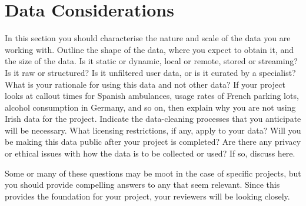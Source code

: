 \chapter{Data Considerations}

In this section you should characterise the nature and scale of the data you are working with. Outline the shape of the data, where you expect to obtain it, and the size of the data. Is it static or dynamic, local or remote, stored or streaming? Is it raw or structured? Is it unfiltered user data, or is it curated by a specialist? What is your rationale for using this data and not other data? If your project looks at callout times for Spanish ambulances, usage rates of French parking lots, alcohol consumption in Germany, and so on, then explain why you are not using Irish data for the project. Indicate the data-cleaning processes that you anticipate will be necessary. What licensing restrictions, if any, apply to your data? Will you be making this data public after your project is completed? Are there any privacy or ethical issues with how the data is to be collected or used? If so, discuss here.

Some or many of these questions may be moot in the case of specific projects, but you should provide compelling answers to any that seem relevant. Since this provides the foundation for your project, your reviewers will be looking closely.
